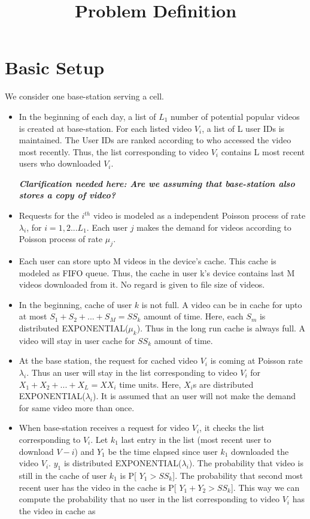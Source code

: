 \documentclass[12pt]{article}
\title{Problem Definition}
\begin{document}
\section*{Basic Setup}
 We consider one base-station serving a cell. 
 

 
\begin{itemize}


\item In the beginning of each day, a list of $L_1$ number of potential popular videos is created at base-station. For each listed video $V_i$, a list of L user IDs is maintained. The User IDs are ranked according to who accessed the video most recently. Thus, the list   corresponding to video $V_i $ contains L most recent users who downloaded $V_i$.

\textbf{\textit{Clarification needed here: Are we assuming that base-station also stores a copy of  video?}}
 
\item Requests for the $i^{th}$ video is modeled as a independent Poisson process of rate $\lambda_{i}$, for $i = 1, 2...L_1$. Each user $j$ makes the demand for videos according to Poisson process of rate $\mu_j$. 
 
\item Each user can store upto M videos in the device's cache. This cache is modeled as FIFO queue. Thus, the cache in user k's device contains last M videos downloaded from it. No regard is given to file size of videos.  

\item In the beginning, cache of user $k$ is not full. A video can be in cache for upto at most $S_1 + S_2 + ... + S_M = SS_k$ amount of time. Here, each $S_m$  is distributed  EXPONENTIAL($\mu_k$). Thus in the long run cache is always full. A video will stay in user cache for $SS_k$ amount of time. 
 
\item At the base station, the request for cached video $V_i$  is coming at Poisson rate $\lambda_i$. Thus an user will stay in the list corresponding to video $V_i$ for $X_1 + X_2 + ... + X_L = XX_i$ time units. Here, $X_i$s are distributed EXPONENTIAL($\lambda_i$). It is assumed that an user will not make the demand for same video more than once. 

\item When base-station receives a request for video $V_i$, it checks the list corresponding to $V_i$. Let $k_1$ last entry in the list (most recent user to download $V-i$) and $Y_1$ be the time elapsed since user $k_1$ downloaded the video $V_i$. $y_1$ is distributed EXPONENTIAL($\lambda_i$). The probability that video is still in the cache of user $k_1$ is P[ $Y_1 > SS_k$]. The probability that second most recent user has the video in the cache is P[ $Y_1 + Y_2 > SS_k$]. This way we can compute the probability that no user in the list corresponding to video $V_i$ has the video in cache as 


\end{itemize}
\end{document}
